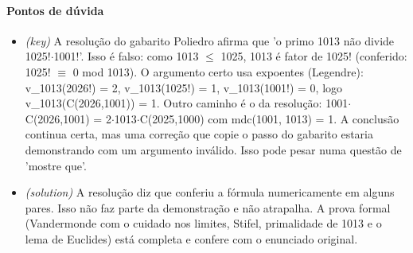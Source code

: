 \documentclass{article}%
\begin{document}
\paragraph{Pontos de dúvida}%
\begin{itemize}%
\item%
\textit{(key)} A resolução do gabarito Poliedro afirma que 'o primo 1013 não divide 1025!$\cdot$1001!'. Isso é falso: como 1013 $\leq$ 1025, 1013 é fator de 1025! (conferido: 1025! $\equiv$ 0 mod 1013). O argumento certo usa expoentes (Legendre): v\_1013(2026!) = 2, v\_1013(1025!) = 1, v\_1013(1001!) = 0, logo v\_1013(C(2026,1001)) = 1. Outro caminho é o da resolução: 1001$\cdot$C(2026,1001) = 2$\cdot$1013$\cdot$C(2025,1000) com mdc(1001, 1013) = 1. A conclusão continua certa, mas uma correção que copie o passo do gabarito estaria demonstrando com um argumento inválido. Isso pode pesar numa questão de 'mostre que'.%
\item%
\textit{(solution)} A resolução diz que conferiu a fórmula numericamente em alguns pares. Isso não faz parte da demonstração e não atrapalha. A prova formal (Vandermonde com o cuidado nos limites, Stifel, primalidade de 1013 e o lema de Euclides) está completa e confere com o enunciado original.%
\end{itemize}%
\end{document}
